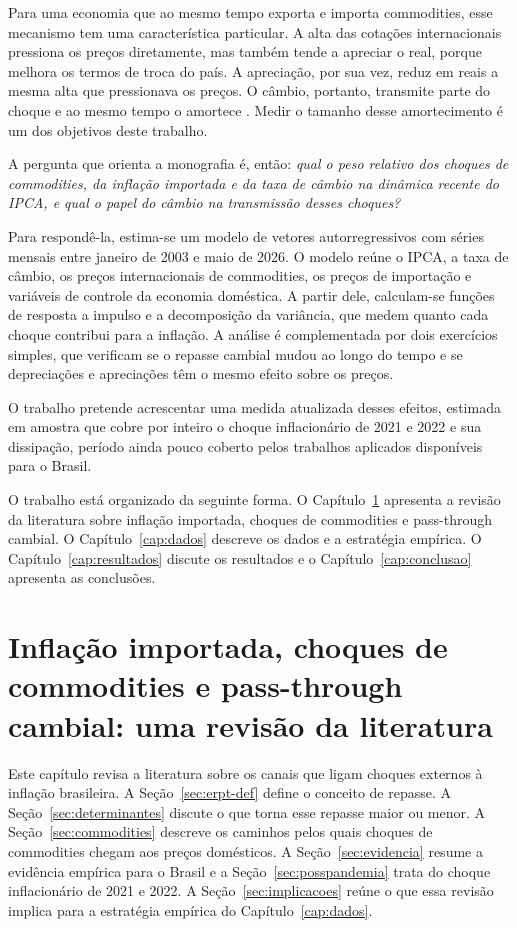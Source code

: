 \documentclass[12pt,openright,oneside,a4paper,portuguese,brazil]{abntex2}
\begin{document}
Para uma economia que ao mesmo tempo exporta e importa commodities, esse
mecanismo tem uma característica particular. A alta das cotações internacionais
pressiona os preços diretamente, mas também tende a apreciar o real, porque
melhora os termos de troca do país. A apreciação, por sua vez, reduz em reais a
mesma alta que pressionava os preços. O câmbio, portanto, transmite parte do
choque e ao mesmo tempo o amortece \cite{stockl2017}. Medir o tamanho desse
amortecimento é um dos objetivos deste trabalho.

A pergunta que orienta a monografia é, então: \textit{qual o peso relativo dos
choques de commodities, da inflação importada e da taxa de câmbio na dinâmica
recente do IPCA, e qual o papel do câmbio na transmissão desses choques?}

Para respondê-la, estima-se um modelo de vetores autorregressivos com séries
mensais entre janeiro de 2003 e maio de 2026. O modelo reúne o IPCA, a taxa de
câmbio, os preços internacionais de commodities, os preços de importação e
variáveis de controle da economia doméstica. A partir dele, calculam-se funções
de resposta a impulso e a decomposição da variância, que medem quanto cada
choque contribui para a inflação. A análise é complementada por dois exercícios
simples, que verificam se o repasse cambial mudou ao longo do tempo e se
depreciações e apreciações têm o mesmo efeito sobre os preços.

O trabalho pretende acrescentar uma medida atualizada desses efeitos, estimada
em amostra que cobre por inteiro o choque inflacionário de 2021 e 2022 e sua
dissipação, período ainda pouco coberto pelos trabalhos aplicados disponíveis
para o Brasil.

O trabalho está organizado da seguinte forma. O Capítulo~\ref{cap:revisao}
apresenta a revisão da literatura sobre inflação importada, choques de
commodities e pass-through cambial. O Capítulo~\ref{cap:dados} descreve os dados
e a estratégia empírica. O Capítulo~\ref{cap:resultados} discute os resultados
e o Capítulo~\ref{cap:conclusao} apresenta as conclusões.

\chapter{Inflação importada, choques de commodities e pass-through cambial: uma revisão da literatura}
\label{cap:revisao}

Este capítulo revisa a literatura sobre os canais que ligam choques externos à
inflação brasileira. A Seção~\ref{sec:erpt-def} define o conceito de repasse. A Seção~\ref{sec:determinantes} discute o que torna esse
repasse maior ou menor. A Seção~\ref{sec:commodities} descreve os caminhos
pelos quais choques de commodities chegam aos preços domésticos. A
Seção~\ref{sec:evidencia} resume a evidência empírica para o Brasil e a
Seção~\ref{sec:posspandemia} trata do choque inflacionário de 2021 e 2022. A Seção~\ref{sec:implicacoes} reúne o que essa revisão implica para a
estratégia empírica do Capítulo~\ref{cap:dados}.
\end{document}
